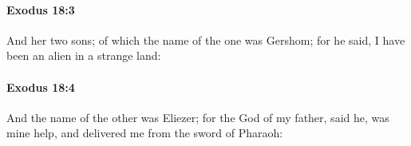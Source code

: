 		\paragraph{Exodus 18:3} %
			\label{EXODUS-18-3}

			And her two sons; of which the name of the one was Gershom; for he said, I have been an alien in a strange land:


		\paragraph{Exodus 18:4} %
			\label{EXODUS-18-4}

			And the name of the other was Eliezer; for the God of my father, said he, was mine help, and delivered me from the sword of Pharaoh:


